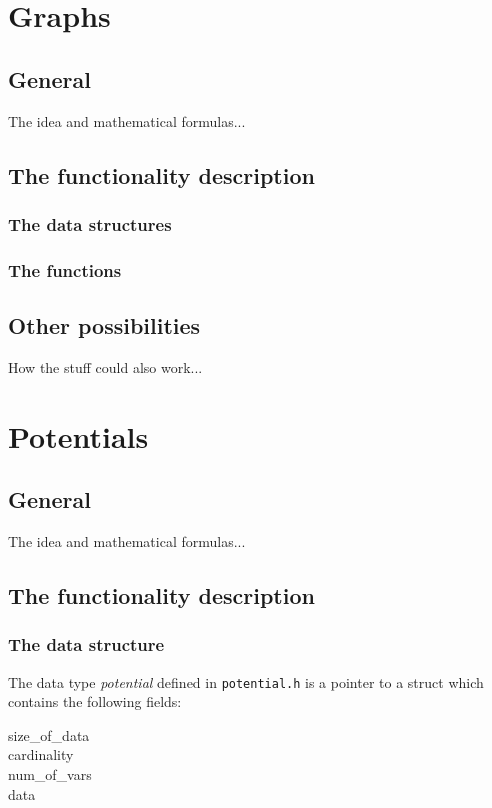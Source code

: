 \documentclass[12pt,a4paper]{report}
\begin{document}
\newpage
\section{Graphs}
\subsection{General}

The idea and mathematical formulas...


\subsection{The functionality description}
\subsubsection{The data structures}

\subsubsection{The functions}


\subsection{Other possibilities}

How the stuff could also work...


\newpage
\section{Potentials}
\subsection{General}

The idea and mathematical formulas...


\subsection{The functionality description}
\subsubsection{The data structure}
The data type {\it potential} defined in \verb+potential.h+ is a
pointer to a struct which contains the following fields:
\begin{description}
\item[size_of_data]

\item[cardinality]

\item[num_of_vars]

\item[data]

\end{description}
\end{document}
